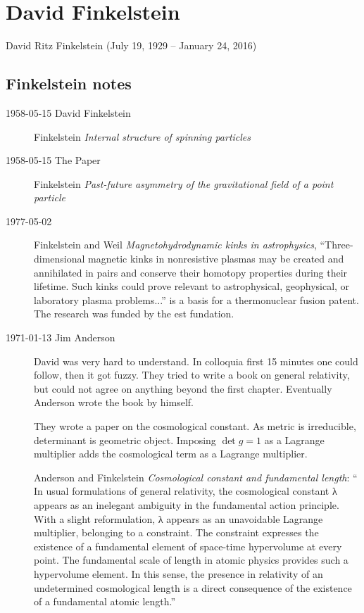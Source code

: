 
\chapter{David Finkelstein}
\label{c-Finkelstein}

David Ritz Finkelstein (July 19, 1929 -- January 24, 2016)



\section{Finkelstein notes}
\label{sect:Finkelstein}

\begin{description}
\item[1958-05-15 David Finkelstein]

Finkelstein
{\em Internal structure of spinning particles}

\item[1958-05-15 The Paper]
Finkelstein
{\em Past-future asymmetry of the gravitational field of a point particle}

\item[1977-05-02]
Finkelstein and Weil
{\em Magnetohydrodynamic kinks in astrophysics},
``Three-dimensional magnetic kinks in nonresistive plasmas may be created
and annihilated in pairs and conserve their homotopy properties during
their lifetime. Such kinks could prove relevant to astrophysical,
geophysical, or laboratory plasma problems...'' is a basis for a
thermonuclear fusion patent. The research was funded by the est fundation.

\item[1971-01-13 Jim Anderson] David was very hard to understand. In
colloquia first 15 minutes one could follow, then it got fuzzy. They
tried to write a book on general relativity, but could not agree on
anything beyond the first chapter. Eventually Anderson wrote the book by
himself.

They wrote a paper on the cosmological constant. As metric is irreducible,
determinant is geometric object. Imposing $\det g = 1$ as a Lagrange
multiplier adds the cosmological term as a Lagrange multiplier.

Anderson and Finkelstein
{\em Cosmological constant and fundamental length}: ``
In usual formulations of general relativity, the cosmological constant λ
appears as an inelegant ambiguity in the fundamental action principle.
With a slight reformulation, λ appears as an unavoidable Lagrange
multiplier, belonging to a constraint. The constraint expresses the
existence of a fundamental element of space-time hypervolume at every
point. The fundamental scale of length in atomic physics provides such a
hypervolume element. In this sense, the presence in relativity of an
undetermined cosmological length is a direct consequence of the existence
of a fundamental atomic length.''


\end{description}
